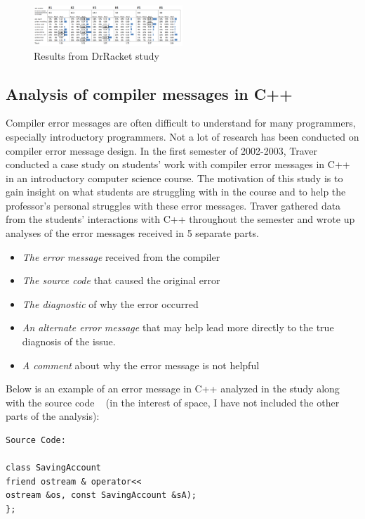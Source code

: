 \documentclass{sig-alternate}
\begin{document}

\begin{figure}[t!]
  \centering
  \includegraphics[keepaspectratio, width=0.5\textwidth]{MEE_Data.png}
  \caption{Results from DrRacket study}
  \label{fig:drracketstudy}
\end{figure}


\subsection{Analysis of compiler messages in C++}
Compiler error messages are often difficult to understand for many programmers, especially introductory programmers.
Not a lot of research has been conducted on compiler error message design.
In the first semester of 2002-2003, Traver conducted a case study on students' work with compiler error messages in C++ in an introductory computer science course.
The motivation of this study is to gain insight on what students are struggling with in the course and to help the professor's personal struggles with these error messages.
Traver gathered data from the students' interactions with C++ throughout the semester and wrote up analyses of the error messages received in 5 separate parts.
\begin{itemize}
	\item \textit{The error message} received from the compiler
	\item \textit{The source code} that caused the original error
	\item \textit{The diagnostic} of why the error occurred
	\item \textit{An alternate error message} that may help lead more directly to the true diagnosis of the issue.
	\item \textit{A comment} about why the error message is not helpful
\end{itemize}

Below is an example of an error message in C++ analyzed in the study along with the source code ~\cite{Traver:2010} (in the interest of space, I have not included the other parts of the analysis):

\begin{verbatim}
Source Code:

class SavingAccount 
friend ostream & operator<<
ostream &os, const SavingAccount &sA);
};
\end{verbatim}
\end{document}
